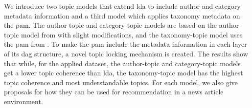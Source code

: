 We introduce two topic models that extend \gls{lda} to include author and category metadata information and a third model which applies taxonomy metadata on the \gls{pam}.
The author-topic and category-topic models are based on the author-topic model from \citet{author_topic_2012} with slight modifications, and the taxonomy-topic model uses the \gls{pam} from \citet{li2006pachinko}.
To make the \gls{pam} include the metadata information in each layer of its \gls{dag} structure, a novel topic locking mechanism is created.
The results show that while, for the applied dataset, the author-topic and category-topic models get a lower topic coherence than \gls{lda}, the taxonomy-topic model has the highest topic coherence and most understandable topics.
For each model, we also give proposals for how they can be used for recommendation in a news article environment.